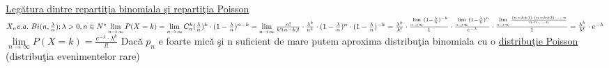 \documentclass[a4paper,12pt]{article}
\begin{document}
	\underline{Leg\u{a}tura dintre reparti\c{t}ia binomiala \c{s}i reparti\c{t}ia Poisson}
	\newline
	$X_n v.a. ~ Bi(n, \frac{\lambda}{n}); \lambda > 0, n \in N^*
	\newline
	\lim\limits_{n\rightarrow\infty}P(X=k) =
	\lim\limits_{n\rightarrow\infty}
	C_n^k(\frac{\lambda}{n})^k\cdot(1-\frac{\lambda}{n})^{n-k} =
	\lim\limits_{n\rightarrow\infty}\frac{n!}{k!(n-k)!} 
	\cdot 
	\frac{\lambda^k}{n^k}
	\cdot
	(1-\frac{\lambda}{n})^n
	\cdot
	(1-\frac{\lambda}{n})^{-k}
	= \frac{\lambda^k}{k!}\cdot
	\frac{\lim\limits_{n\rightarrow\infty}(1-\frac{\lambda}{n})^{-k}}{1}
	\cdot \frac{\lim\limits_{n\rightarrow\infty}(1-\frac{\lambda}{n})^n}{e^{-\lambda}}
	\cdot \frac{\lim\limits_{n\rightarrow\infty}\frac{(n-k+1)\cdot(n-k+2)\cdot...\cdot n}{n\cdot n\cdot ... \cdot n}}{1}
	= \frac{\lambda^k}{k!}\cdot e^{-\lambda}$
	\newline
	$\lim\limits_{n\rightarrow\infty}P(X=k) = \frac{e^{-\lambda}\cdot \lambda^k}{l!}$
	\newline
	Dac\u{a} $p_n$ e foarte mic\u{a} \c{s}i n suficient de mare putem aproxima distribu\c{t}ia binomiala cu o \underline{distribu\c{t}ie Poisson} (distribu\c{t}ia evenimentelor rare)
	\newline
\end{document}
